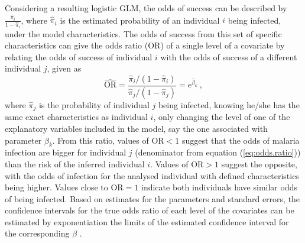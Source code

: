 Considering a resulting logistic GLM, the odds of success can be described by $\textstyle\frac{\widehat{\pi}_{i}}{1-\widehat{\pi}_{i}}$, where $\widehat{\pi}_{i}$ is the estimated probability of an individual $i$ being infected, under the model characteristics.
The odds of success from this set of specific characteristics can give the odds ratio (OR) of a single level of a covariate by relating the odds of success of individual $i$ with the odds of success of a different individual $j$, given as
%
\begin{equation}
\label{eq:odds.ratio}
    \widehat{\text{OR}} = \frac{\widehat{\pi}_i/\left(1-\widehat{\pi}_i\right)}{\widehat{\pi}_j/\left(1-\widehat{\pi}_j\right)}= e^{\widehat{\beta}_k}\ ,
\end{equation}
%
\noindent
where $\widehat{\pi}_j$ is the probability of individual $j$ being infected, knowing he/she has the same exact characteristics as individual $i$, only changing the level of one of the explanatory variables included in the model, say the one associated with parameter $\beta_k$.
From this ratio, values of $\text{OR}<1$ suggest that the odds of malaria infection are bigger for individual $j$ (denominator from equation (\ref{eq:odds.ratio})) than the risk of the inferred individual $i$.
Values of $\text{OR}>1$ suggest the opposite, with the odds of infection for the analysed individual with defined characteristics being higher.
Values close to $\text{OR}=1$ indicate both individuals have similar odds of being infected.
Based on estimates for the parameters and standard errors, the confidence intervals for the true odds ratio of each level of the covariates can be estimated by exponentiation the limits of the estimated confidence interval for the corresponding $\beta$ \cite{collet2003modelling}.
%


